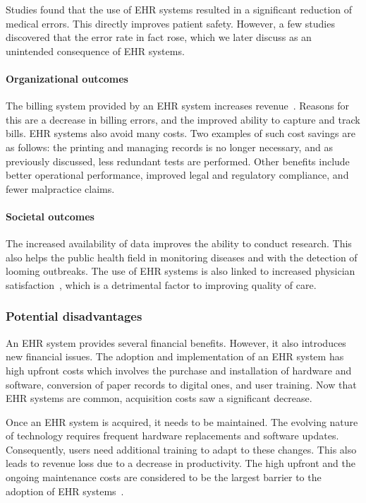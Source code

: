         Studies found that the use of EHR systems resulted in a significant reduction of medical errors. This directly improves patient safety. However, a few studies discovered that the error rate in fact rose, which we later discuss as an unintended consequence of EHR systems.

        \paragraph{Organizational outcomes} The billing system provided by an EHR system increases revenue~\cite{Menachemi2011}. Reasons for this are a decrease in billing errors, and the improved ability to capture and track bills. EHR systems also avoid many costs. Two examples of such cost savings are as follows: the printing and managing records is no longer necessary, and as previously discussed, less redundant tests are performed. Other benefits include better operational performance, improved legal and regulatory compliance, and fewer malpractice claims.

        \paragraph{Societal outcomes} The increased availability of data improves the ability to conduct research. This also helps the public health field in monitoring diseases and with the detection of looming outbreaks. The use of EHR systems is also linked to increased physician satisfaction~\cite{Menachemi2009}, which is a detrimental factor to improving quality of care.

        \subsubsection{Potential disadvantages}\label{ehrs_disadvantages}

        An EHR system provides several financial benefits. However, it also introduces new financial issues. The adoption and implementation of an EHR system has high upfront costs which involves the purchase and installation of hardware and software, conversion of paper records to digital ones, and user training. Now that EHR systems are common, acquisition costs saw a significant decrease.

        Once an EHR system is acquired, it needs to be maintained. The evolving nature of technology requires frequent hardware replacements and software updates. Consequently, users need additional training to adapt to these changes. This also leads to revenue loss due to a decrease in productivity. The high upfront and the ongoing maintenance costs are considered to be the largest barrier to the adoption of EHR systems~\cite{Menachemi2006}.

